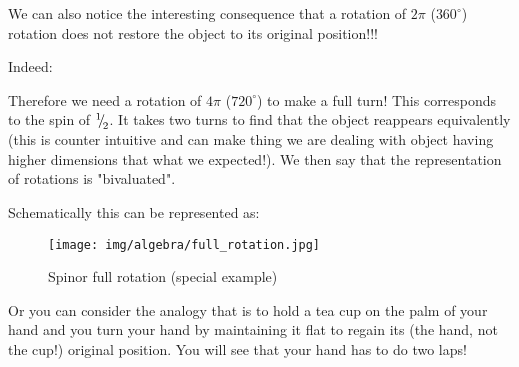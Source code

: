 	We can also notice the interesting consequence that a rotation of $2\pi$ ($360^\circ$) rotation does not restore the object to its original position!!!
	
	Indeed:
	
	Therefore we need a rotation of $4\pi$ ($720^\circ$) to make a full turn! This corresponds to the spin of ${}^1{\mskip -5mu/\mskip -3mu}_2$. It takes two turns to find that the object reappears equivalently (this is counter intuitive and can make thing we are dealing with object having higher dimensions that what we expected!). We then say that the representation of rotations is "bivaluated".
	
	Schematically this can be represented as:
	\begin{figure}[H]
		\centering
		\texttt{[image: img/algebra/full\_rotation.jpg]}
		\caption{Spinor full rotation (special example)}
	\end{figure}
	Or you can consider the analogy that is to hold a tea cup on the palm of your hand and you turn your hand by maintaining it flat to regain its (the hand, not the cup!) original position. You will see that your hand has to do two laps!
	
	\pagebreak
